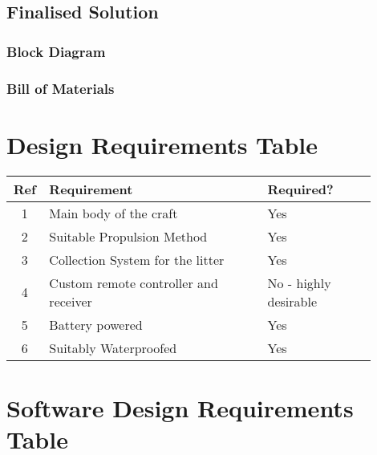 \documentclass [11pt]{article}
\begin{document}
\subsection{Finalised Solution}


\subsubsection{Block Diagram}
\subsubsection{Bill of Materials} 




\appendix

\section{Design Requirements Table}\label{app:design_requirements_hardware}

\begin{table}[H]
\begin{tabular}{||c||p{0.6\linewidth}|p{0.3\linewidth}||}
\hline
Ref & Requirement                           & Required?             \\
\hline
1   & Main body of the craft                & Yes                   \\
\hline
2   & Suitable Propulsion Method            & Yes                   \\
\hline
3   & Collection System for the litter      & Yes                   \\
\hline
4   & Custom remote controller and receiver & No - highly desirable \\
\hline
5   & Battery powered                       & Yes                   \\
\hline
6   & Suitably Waterproofed                 & Yes\\
\hline              
\end{tabular}
\end{table}

\section{Software Design Requirements Table}\label{app:design_requirements_software}
\end{document}
